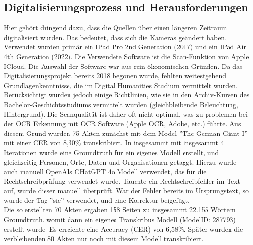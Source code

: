 \documentclass[12pt, a4paper, ngerman, bidi=default]{article}
\begin{document}
\subsection{Digitalisierungsprozess und Herausforderungen}
    Hier gehört dringend dazu, dass die Quellen über einen längeren Zeitraum digitalisiert wurden. Das bedeutet, dass sich die Kameras geändert haben. 
    Verwendet wurden primär ein IPad Pro 2nd Generation (2017) und ein IPad Air 4th Generation (2022). Die Verwendete Software ist die Scan-Funktion von Apple ICloud. 
    Die Auswahl der Software war aus rein ökonomischen Gründen. Da das Digitalisierungsprojekt bereits 2018 begonen wurde, fehlten weitestgehend Grundlagenkenntnisse, 
    die im Digital Humanities Studium vermittelt wurden. Berücksichtigt wurden jedoch einige Richtlinien, wie sie in den Archiv-Kursen des Bachelor-Geschichtsstudiums vermittelt wurden 
    (gleichbleibende Beleuchtung, Hintergrund). Die Scanqualität ist daher oft nicht optimal, was zu problemen bei der OCR Erkennung mit OCR Software (Apple OCR, Adobe, etc.) führte. 
    Aus diesem Grund wurden 75 Akten zunächst mit dem Model ”The German Giant I” mit einer CER von 8,30\% transkribiert. In insgesammt  mit insgesammt  4 Iterationen wurde eine Groundtruth 
    für ein eigenes Modell erstellt, und gleichzeitig Personen, Orte, Daten und Organisationen getaggt. Hierzu wurde auch manuell OpenAIs CHatGPT 4o Modell verwendet, das für die 
    Rechtschreibprüfung verwendet wurde. Tauchte ein Rechtschreibfehler im Text auf, wurde dieser manuell überprüft. War der Fehler bereits im Ursprungstext, so wurde der Tag ”sic” verwendet,
    und eine Korrektur beigefügt.\\
    Die so erstellten 70 Akten ergaben 158 Seiten zu insgesammt 22.155 Wörtern Groundtruth, womit dann ein eigenes Transkribus Modell 
    (\href{https://app.transkribus.org/models/public/287793}{ModelID: 287793}) erstellt wurde. Es erreichte eine Accuracy (CER) von 6,58\%. Später wurden die verbleibenden 80 Akten nur noch 
    mit diesem Modell transkribiert. \\
  
\end{document}
